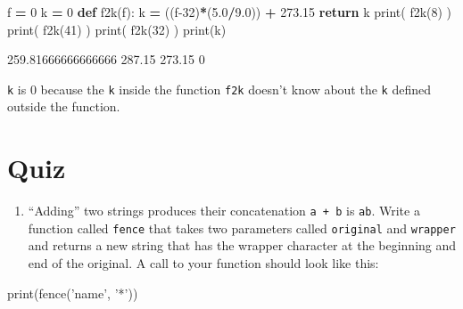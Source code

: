 \documentclass[]{book}
\newenvironment{Shaded}{\begin{snugshade}}{\end{snugshade}}
\newcommand{\BuiltInTok}[1]{#1}
\newcommand{\ControlFlowTok}[1]{\textcolor[rgb]{0.13,0.29,0.53}{\textbf{#1}}}
\newcommand{\DecValTok}[1]{\textcolor[rgb]{0.00,0.00,0.81}{#1}}
\newcommand{\FloatTok}[1]{\textcolor[rgb]{0.00,0.00,0.81}{#1}}
\newcommand{\KeywordTok}[1]{\textcolor[rgb]{0.13,0.29,0.53}{\textbf{#1}}}
\newcommand{\NormalTok}[1]{#1}
\newcommand{\OperatorTok}[1]{\textcolor[rgb]{0.81,0.36,0.00}{\textbf{#1}}}
\newcommand{\StringTok}[1]{\textcolor[rgb]{0.31,0.60,0.02}{#1}}
\providecommand{\tightlist}{%
  \setlength{\itemsep}{0pt}\setlength{\parskip}{0pt}}
\theoremstyle{definition}
\theoremstyle{definition}
\theoremstyle{definition}
\theoremstyle{remark}
\begin{document}
\begin{Shaded}
\begin{Highlighting}[]
\NormalTok{f }\OperatorTok{=} \DecValTok{0}
\NormalTok{k }\OperatorTok{=} \DecValTok{0}
\KeywordTok{def}\NormalTok{ f2k(f):}
\NormalTok{    k }\OperatorTok{=}\NormalTok{ ((f}\DecValTok{-32}\NormalTok{)}\OperatorTok{*}\NormalTok{(}\FloatTok{5.0}\OperatorTok{/}\FloatTok{9.0}\NormalTok{)) }\OperatorTok{+} \FloatTok{273.15}
    \ControlFlowTok{return}\NormalTok{ k}
\BuiltInTok{print}\NormalTok{( f2k(}\DecValTok{8}\NormalTok{) )}
\BuiltInTok{print}\NormalTok{( f2k(}\DecValTok{41}\NormalTok{) )}
\BuiltInTok{print}\NormalTok{( f2k(}\DecValTok{32}\NormalTok{) )}
\BuiltInTok{print}\NormalTok{(k)}
\end{Highlighting}
\end{Shaded}

\begin{Shaded}
\begin{Highlighting}[]
\FloatTok{259.81666666666666}
\FloatTok{287.15}
\FloatTok{273.15}
\DecValTok{0}
\end{Highlighting}
\end{Shaded}

\texttt{k} is 0 because the \texttt{k} inside the function \texttt{f2k}
doesn't know about the \texttt{k} defined outside the function.

\hypertarget{quiz-4}{%
\section{Quiz}\label{quiz-4}}

\begin{enumerate}
\def\labelenumi{\arabic{enumi}.}
\tightlist
\item
  ``Adding'' two strings produces their concatenation
  \texttt{\textquotesingle{}a\textquotesingle{}\ +\ \textquotesingle{}b\textquotesingle{}}
  is \texttt{\textquotesingle{}ab\textquotesingle{}}. Write a function
  called \texttt{fence} that takes two parameters called
  \texttt{original} and \texttt{wrapper} and returns a new string that
  has the wrapper character at the beginning and end of the original. A
  call to your function should look like this:
\end{enumerate}

\begin{Shaded}
\begin{Highlighting}[]
\BuiltInTok{print}\NormalTok{(fence(}\StringTok{'name'}\NormalTok{, }\StringTok{'*'}\NormalTok{))}
\end{Highlighting}
\end{Shaded}
\end{document}
